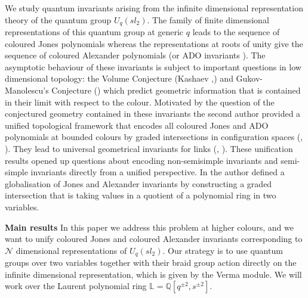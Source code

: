 \documentclass[reqno,a4paper,11pt]{amsart}
\numberwithin{equation}{section}
\numberwithin{figure}{section}
\theoremstyle{definition}
\theoremstyle{plain}
\newcommand{\Q}{\mathbb Q}
\newcommand{\Liq}{\mathbb L}
\newcommand{\cN}{\mathcal{N}}
\begin{document}
We study quantum invariants arising from the infinite dimensional representation theory of the quantum group $U_q(sl_2)$. 
The family of finite dimensional representations of this quantum group at generic $q$ leads to the sequence of coloured Jones polynomials whereas the  representations at roots of unity give the sequence of coloured Alexander polynomials (or ADO invariants \cite{ADO}). 
The asymptotic behaviour of these invariants is subject to important questions in low dimensional topology: the Volume Conjecture (Kashaev \cite{K},\cite{M2}) and Gukov-Manolescu's Conjecture (\cite{GM}) which predict geometric information that is contained in their limit with respect to the colour. 
Motivated by the question of the conjectured geometry contained in these invariants the second author provided a unified topological framework that encodes all coloured Jones and ADO polynomials at bounded colours by graded intersections in configuration spaces (\cite{Cr1}, \cite{Cr2}). They lead to universal geometrical invariants for links (\cite{Cru1}, \cite{Cru2}).  These unification results opened up questions about encoding non-semisimple invariants and semi-simple invariants directly from a unified perspective. In \cite{CrG} the author defined a globalisation of Jones and Alexander invariants by constructing a graded intersection that is taking values in a  quotient of a polynomial ring in two variables. 

{\bf Main results} In this paper we address this problem at higher colours, and we want to unify coloured Jones and coloured Alexander invariants corresponding to $\cN$ dimensional representations of $U_q(sl_2)$. 
Our strategy is to use quantum groups over two variables together with their braid group action directly on the infinite dimensional representation, which is given by the Verma module. We will work over the Laurent polynomial ring $\Liq=\Q[q^{\pm2}, s^{\pm 2}]$.
\end{document}
